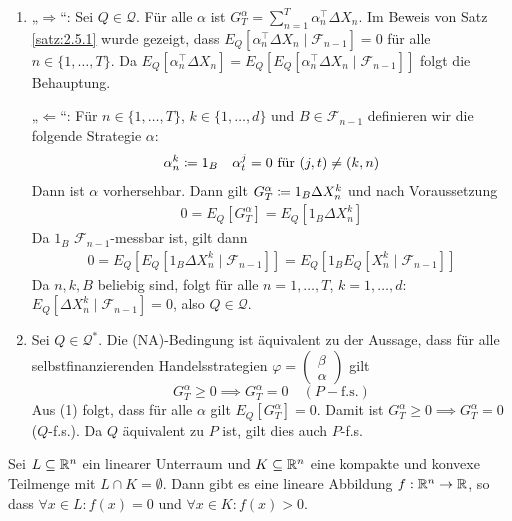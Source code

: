\documentclass[a4paper,twoside,DIV15,BCOR12mm]{scrbook}
\newcommand{\cF}{\mathcal F}
\newcommand{\cQ}{\mathcal Q}
\begin{document}
\begin{beweis}
\begin{enumerate}
\item „$\Longrightarrow$“: Sei $Q\in\cQ$. Für alle $\alpha$ ist $G_T^\alpha = \sum_{n=1}^T \alpha_n^\top \Delta X_n$. Im Beweis von Satz \ref{satz:2.5.1} wurde gezeigt, dass $E_Q[\alpha_n^\top \Delta X_n\mid \cF_{n-1}]=0$ für alle $n\in\{1,\ldots,T\}$. Da $E_Q[\alpha_n^\top \Delta X_n] = E_Q[E_Q[\alpha_n^\top \Delta X_n \mid \cF_{n-1}]]$ folgt die Behauptung.

„$\Longleftarrow$“: Für $n\in\{1,\ldots,T\}$, $k\in\{1,\ldots,d\}$ und $B\in\cF_{n-1}$ definieren wir die folgende Strategie $\alpha$:
\begin{align*}
\alpha_n^k\da 1_B && \alpha_t^j = 0 \text{ für } (j,t) \ne (k,n)
\end{align*}
Dann ist $\alpha$ vorhersehbar. Dann gilt $G_T^\alpha \da 1_B\Delta X_n^k$ und nach Voraussetzung
\begin{align*}
0 = E_Q[G_T^\alpha] = E_Q[1_B \Delta X_n^k]
\end{align*}
Da $1_B$ $\cF_{n-1}$-messbar ist, gilt dann 
\begin{align*}
0 = E_Q[E_Q[1_B \Delta X_n^k\mid \cF_{n-1}]] = E_Q[1_B E_Q[X_n^k\mid \cF_{n-1}]]
\end{align*}
Da $n,k,B$ beliebig sind, folgt für alle $n=1,\ldots,T$, $k=1,\ldots,d$: $E_Q[\Delta X_n^k\mid \cF_{n-1}]=0$, also $Q\in \cQ$.
\item Sei $Q\in \cQ^*$. Die (NA)-Bedingung ist äquivalent zu der Aussage, dass für alle selbstfinanzierenden Handelsstrategien
$\varphi=\left(\begin{smallmatrix} \beta \\ \alpha \end{smallmatrix}\right)$ 
gilt
\[
G_T^\alpha \ge 0 \implies G_T^\alpha = 0 \quad (P-\text{f.s.})
\]
Aus (1) folgt, dass für alle $\alpha$ gilt $E_Q[G^\alpha_T] = 0$. Damit ist $G_T^\alpha \ge 0 \implies G_T^\alpha = 0$ ($Q$-f.s.). Da $Q$ äquivalent zu $P$ ist, gilt dies auch $P$-f.s.
\end{enumerate}
\end{beweis}


\begin{lemma}[Trennungssatz]
Sei $L\subseteq \mathbb{R}^n$ ein linearer Unterraum und $K\subseteq \mathbb{R}^n$ eine kompakte und konvexe Teilmenge mit $L\cap K=\emptyset$. Dann gibt es eine lineare Abbildung $f:\mathbb{R}^n \to \mathbb{R}$, so dass $\forall x\in L: f(x) = 0$ und $\forall x\in K: f(x) >0$.
\label{lem:2.5.3}
\end{lemma}
\end{document}
